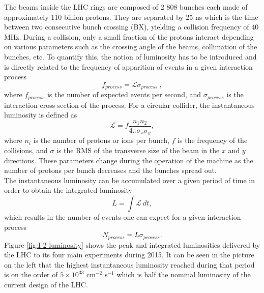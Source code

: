   	The beams inside the LHC rings are composed of 2 808 bunches each made of approximately 110 billion protons. They are separated by 25 ns which is the time between two consecutive bunch crossing (BX), yielding a collision frequency of 40 MHz. During a collision, only a small fraction of the protons interact depending on various parameters such as the crossing angle of the beams, collimation of the bunches, etc. To quantify this, the notion of luminosity has to be introduced and is directly related to the frequency of apparition of events in a given interaction process
  	\begin{equation}
  		f_{process} = \mathcal{L} \sigma_{process} \ ,
  	\end{equation}
  	where $ f_{process} $ is the number of expected events per second, and $ \sigma_{process} $ is the interaction cross-section of the process. For a circular collider, the instantaneous luminosity is defined as
  	\begin{equation}
  		\mathcal{L} = f \frac{n_1 n_2}{4 \pi \sigma_x \sigma_y},
  	\end{equation}
  	where $ n_i $ is the number of protons or ions per bunch, $ f $ is the frequency of the collisions, and $ \sigma $ is the RMS of the transverse size of the beam in the $x$ and $y$ directions. These parameters change during the operation of the machine as the number of protons per bunch decreases and the bunches spread out. \\

    The instantaneous luminosity can be accumulated over a given period of time in order to obtain the integrated luminosity
  	\begin{equation}
  		L = \int \mathcal{L} \ dt ,
  	\end{equation}
  	which results in the number of events one can expect for a given interaction process
  	\begin{equation}
  		N_{process} = L \sigma_{process} .
  	\end{equation}
    Figure \ref{fig:I-2-luminosity} shows the peak and integrated luminosities delivered by the LHC to its four main experiments during 2015. It can be seen in the picture on the left that the highest instantaneous luminosity reached during that period is on the order of $ 5 \times 10^{33} $ cm$^{-2}$ s$^{-1}$ which is half the nominal luminosity of the current design of the LHC.

